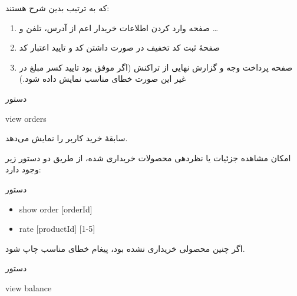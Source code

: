 \documentclass[]{article}
\begin{document}
که به ترتیب بدین شرح هستند:

\begin{enumerate}

\item
صفحه وارد کردن اطلاعات خریدار اعم از آدرس، تلفن و …

\item
صفحهٔ ثبت کد تخفیف در صورت داشتن کد و تایید اعتبار کد

\item
صفحه پرداخت وجه و گزارش نهایی از تراکنش‌ (اگر موفق بود تایید کسر مبلغ در غیر این صورت خطای مناسب نمایش داده‌ شود.)


\end{enumerate}

\hrulefill


\begin{mybox}[colback=yellow]{دستور}

\begin{latin}

view orders

\end{latin}

\end{mybox}

سابقۀ خرید کاربر را نمایش می‌دهد.

امکان مشاهده جزئیات یا نظردهی محصولات خریداری شده، از طریق دو دستور زیر وجود دارد:

\begin{mybox}[colback=brilliantlavender]{دستور}

\begin{latin}

\begin{itemize}[label = {$\Rightarrow$}]

\item
show order [orderId]

\item
rate [productId] [1-5]

\end{itemize}

\end{latin}

\end{mybox}

اگر چنین محصولی خریداری نشده بود، پیغام خطای مناسب چاپ شود.

\hrulefill


\begin{mybox}[colback=yellow]{دستور}

\begin{latin}

view balance

\end{latin}

\end{mybox}
\end{document}
